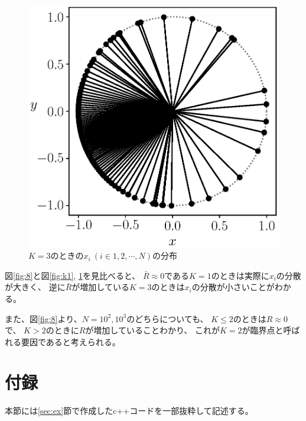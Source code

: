 \documentclass[a4j, titlepage]{jsarticle}
\numberwithin{equation}{section}
\begin{document}
\begin{figure}[h]
\begin{minipage}{0.49\hsize}
                    \includegraphics[width=1\hsize]{kadai8/K3.eps}
                    \caption{
                        $K=3$のときの$x_i \ (i\in 1, 2, \cdots,N)$の分布
                    }
                    \label{fig:k3}
                \end{minipage}
            \end{figure}
            図\ref{fig:8}と図\ref{fig:k1}, \ref{fig:k3}を見比べると、
            $\bar{R}\approx 0$である$K=1$のときは実際に$x_i$の分散が大きく、
            逆に$\bar{R}$が増加している$K=3$のときは$x_i$の分散が小さいことがわかる。

            また、図\ref{fig:8}より、$N = 10^2, 10^3$のどちらについても、
            $K \leq 2$のときは$R\approx 0$で、
            $K > 2$のときに$R$が増加していることわかり、
            これが$K = 2$が臨界点と呼ばれる要因であると考えられる。

\section{付録}
    本節には\ref{sec:ex}節で作成したc++コードを一部抜粋して記述する。
\end{document}
